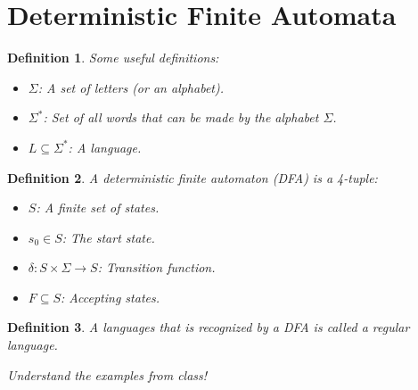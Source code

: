 \documentclass{article}
\newtheorem{definition}{Definition}
\begin{document}
\section{Deterministic Finite Automata}
\begin{definition}
Some useful definitions:
\begin{itemize}
    \item $\Sigma$: A set of letters (or an alphabet).
    \item $\Sigma^*$: Set of all words that can be made by the alphabet $\Sigma$.
    \item $L \subseteq \Sigma^*$: A language.
\end{itemize}
\end{definition}
\begin{definition}
A deterministic finite automaton (DFA) is a 4-tuple:
\begin{itemize}
    \item $S$: A finite set of states.
    \item $s_0 \in S$: The start state.
    \item $\delta : S\times \Sigma \rightarrow S$: Transition function.
    \item $F \subseteq S$: Accepting states.
\end{itemize}
\end{definition}
\begin{definition}
A languages that is recognized by a DFA is called a regular language.
\end{definition}
\noindent\textit{Understand the examples from class!}
\end{document}
